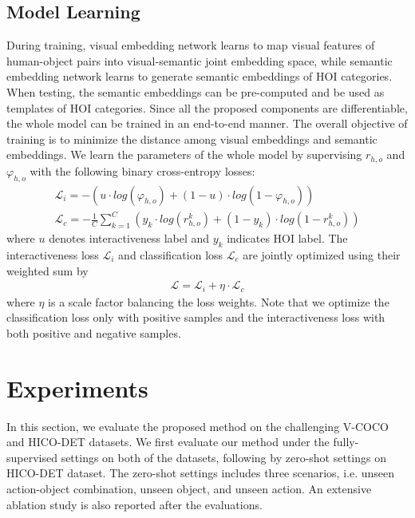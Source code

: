 \documentclass[sigconf,screen]{acmart}
\begin{document}
\subsection{Model Learning}

During training, visual embedding network learns to map visual features of human-object pairs into visual-semantic joint embedding space, while semantic embedding network learns to generate semantic embeddings of HOI categories. When testing, the semantic embeddings can be pre-computed and be used as templates of HOI categories. Since all the proposed components are differentiable, the whole model can be trained in an end-to-end manner. The overall objective of training is to minimize the distance among visual embeddings and semantic embeddings. We learn the parameters of the whole model by supervising $r_{h, o}$ and $\varphi_{h, o}$ with the following binary cross-entropy losses:
\begin{gather}
\mathcal{L}_i = -(u \cdot log(\varphi_{h, o}) + (1 - u) \cdot log(1 - \varphi_{h, o}))\\
\mathcal{L}_c = -\frac{1}{C} \sum^C_{k = 1} (y_k \cdot log(r^k_{h, o}) + (1 - y_k) \cdot log(1 - r^k_{h, o}))
\end{gather}
where $u$ denotes interactiveness label and $y_k$ indicates HOI label. The interactiveness loss $\mathcal{L}_i$ and classification loss $\mathcal{L}_c$ are jointly optimized using their weighted sum by
\begin{gather}
\mathcal{L} = \mathcal{L}_i + \eta \cdot \mathcal{L}_c
\end{gather}
where $\eta$ is a scale factor balancing the loss weights. Note that we optimize the classification loss only with positive samples and the interactiveness loss with both positive and negative samples.

\section{Experiments}

In this section, we evaluate the proposed method on the challenging V-COCO \cite{gupta2015visual} and HICO-DET \cite{chao2018learning} datasets. We first evaluate our method under the fully-supervised settings on both of the datasets, following by zero-shot settings on HICO-DET dataset. The zero-shot settings includes three scenarios, i.e. unseen action-object combination, unseen object, and unseen action. An extensive ablation study is also reported after the evaluations.
\end{document}
